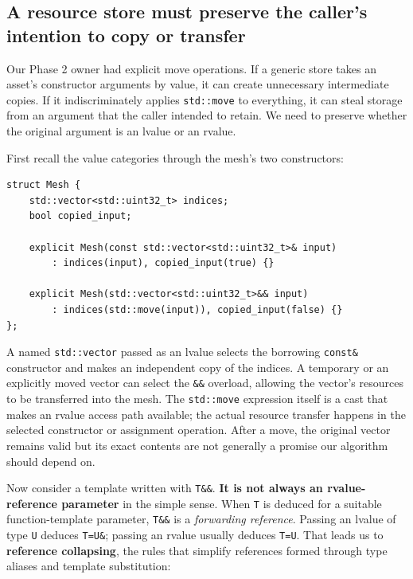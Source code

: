 \subsection{A resource store must preserve the caller's intention to copy or transfer}\label{05-engine-i-ch005-a-resource-store-must-preserve-the-callers-intention-to-copy-or-transfer}

Our Phase 2 owner had explicit move operations. If a generic store takes an asset's constructor arguments by value, it can create unnecessary intermediate copies. If it indiscriminately applies \texttt{std::move} to everything, it can steal storage from an argument that the caller intended to retain. We need to preserve whether the original argument is an lvalue or an rvalue.

First recall the value categories through the mesh's two constructors:

\begin{verbatim}
struct Mesh {
    std::vector<std::uint32_t> indices;
    bool copied_input;

    explicit Mesh(const std::vector<std::uint32_t>& input)
        : indices(input), copied_input(true) {}

    explicit Mesh(std::vector<std::uint32_t>&& input)
        : indices(std::move(input)), copied_input(false) {}
};
\end{verbatim}

A named \texttt{std::vector} passed as an lvalue selects the borrowing \texttt{const\&} constructor and makes an independent copy of the indices. A temporary or an explicitly moved vector can select the \texttt{\&\&} overload, allowing the vector's resources to be transferred into the mesh. The \texttt{std::move} expression itself is a cast that makes an rvalue access path available; the actual resource transfer happens in the selected constructor or assignment operation. After a move, the original vector remains valid but its exact contents are not generally a promise our algorithm should depend on.

Now consider a template written with \texttt{T\&\&}. \textbf{It is not always an rvalue-reference parameter} in the simple sense. When \texttt{T} is deduced for a suitable function-template parameter, \texttt{T\&\&} is a \emph{forwarding reference}. Passing an lvalue of type \texttt{U} deduces \texttt{T=U\&}; passing an rvalue usually deduces \texttt{T=U}. That leads us to \textbf{reference collapsing}, the rules that simplify references formed through type aliases and template substitution:


